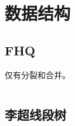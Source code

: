 \section{数据结构}

\subsection{FHQ}

仅有分裂和合并。

\inputminted{cpp}{icpc/ds/treap/treap.cpp}

\subsection{李超线段树}

\inputminted{cpp}{icpc/ds/CNM/CNM.cpp}
